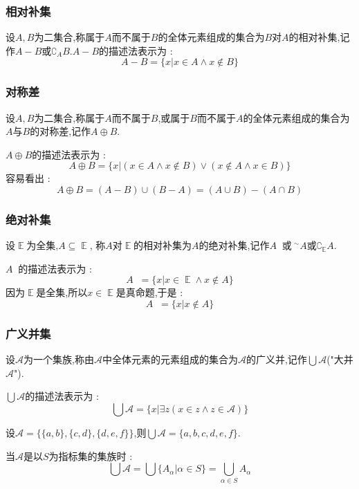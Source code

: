 \documentclass[UTF8,12pt]{ctexbook}
\DeclareMathOperator{\mathEverythingCollection}{\mathbb{E}}
\DeclareMathOperator{\unionSet}{\cup}
\DeclareMathOperator{\intersectionSet}{\cap}
\DeclareMathOperator{\absoluteCompletementSet}{^\complement}
\begin{document}
{{{{\subsubsection{相对补集}{
  设$A,B$为二集合,称属于$A$而不属于$B$的全体元素组成的集合为$B$对$A$的相对补集,记作$A - B$或$\complement_A B$.$A - B$的描述法表示为 : $$
    A - B = \{x | x \in A \land x \notin B\}
  $$
}%

\subsubsection{对称差}{
  设$A,B$为二集合,称属于$A$而不属于$B$,或属于$B$而不属于$A$的全体元素组成的集合为$A$与$B$的对称差,记作$A \oplus B$.

  $A \oplus B$的描述法表示为 : $$
    A \oplus B = \{x | (x \in A \land x \notin B) \lor (x \notin A \land x \in B)\}
  $$
  容易看出 : $$
    A \oplus B = (A - B) \unionSet (B - A) = (A \unionSet B) - (A \intersectionSet B)
  $$
}%

\subsubsection{绝对补集}{
  设$\mathEverythingCollection$为全集,$A \subseteq \mathEverythingCollection$, 称$A$对$\mathEverythingCollection$的相对补集为$A$的绝对补集,记作$A\absoluteCompletementSet$或${~}^\sim A$或$\complement_{\mathEverythingCollection} A$.

  $A\absoluteCompletementSet$的描述法表示为 : $$
    A\absoluteCompletementSet = \{x | x \in \mathEverythingCollection \land x \notin A\}
  $$
  因为$\mathEverythingCollection$是全集,所以$x \in \mathEverythingCollection$是真命题,于是 : $$
    A\absoluteCompletementSet = \{x | x \notin A\}
  $$
}%

\subsubsection{广义并集}{
  设$\mathcal{A}$为一个集族,称由$\mathcal{A}$中全体元素的元素组成的集合为$\mathcal{A}$的广义并,记作$\bigcup \mathcal{A}$("大并$\mathcal{A}$").

  $\bigcup \mathcal{A}$的描述法表示为 : $$
    \bigcup\mathcal{A} = \{x | \exists z (x \in z \land z \in \mathcal{A})\}
  $$

  设$\mathcal{A} = \{\{a,b\},\{c,d\},\{d,e,f\}\}$,则$\bigcup \mathcal{A} = \{a,b,c,d,e,f\}$.

  当$\mathcal{A}$是以$S$为指标集的集族时 : $$
    \bigcup\mathcal{A} = \bigcup\{A_\alpha | \alpha \in S\} = \bigcup_{\alpha \in S}A_\alpha
  $$
}%

}}}}
\end{document}
